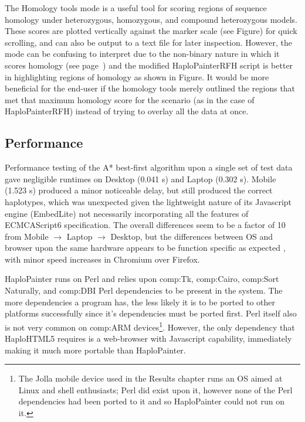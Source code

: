 The Homology tools mode is a useful tool for scoring regions of sequence homology under heterozygous, homozygous, and compound heterozygous models. These scores are plotted vertically against the marker scale (see Figure) for quick scrolling, and can also be output to a text file for later inspection. However, the mode can be confusing to interpret due to the non-binary nature in which it scores homology (see page~\pageref{ref:haplo:homologyscoredet}) and the modified HaploPainterRFH script is better in highlighting regions of homology as shown in Figure. It would be more beneficial for the end-user if the homology tools merely outlined the regions that met that maximum homology score for the scenario (as in the case of HaploPainterRFH) instead of trying to overlay all the data at once.

\subsection{Performance}

Performance testing of the A* best-first algorithm upon a single set of test data gave negligible runtimes on Desktop (0.041 s) and Laptop (0.302 s). Mobile (1.523 s) produced a minor noticeable delay, but still produced the correct haplotypes, which was unexpected given the lightweight nature of its Javascript engine (EmbedLite) not necessarily incorporating all the features of ECMCAScript6 specification. The overall differences seem to be a factor of 10 from Mobile $\rightarrow$ Laptop $\rightarrow$ Desktop, but the differences between OS and browser upon the same hardware appears to be function specific as expected \cite{ratanaworabhan2010jsmeter}, with minor speed increases in Chromium over Firefox.

HaploPainter runs on Perl and relies upon \gls{comp:Tk}, \gls{comp:Cairo}, \gls{comp:Sort Naturally}, and \gls{comp:DBI} Perl dependencies to be present in the system. The more dependencies a program has, the less likely it is to be ported to other platforms successfully since it's dependencies must be ported first. Perl itself also is not very common on \gls{comp:ARM} devices\footnote{The Jolla mobile device used in the Results chapter runs an OS aimed at Linux and shell enthusiasts; Perl did exist upon it, however none of the Perl dependencies had been ported to it and so HaploPainter could not run on it.}. However, the only dependency that HaploHTML5 requires is a web-browser with Javascript capability, immediately making it much more portable than HaploPainter.


